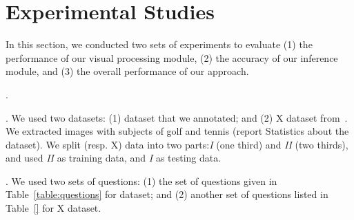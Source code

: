 \section{Experimental Studies}
\label{sec-expt}

In this section, we conducted two sets of experiments to evaluate (1) the performance of our visual processing module, (2) the accuracy of our inference module, and (3) the overall performance of our approach. 

. %

. We used two datasets: (1)  dataset that we annotated; and (2) X dataset from~\cite{}. We extracted images with subjects of golf and tennis (report Statistics about the dataset). We split  (resp. X) data into two parts:{\em  I} (one third) and {\em II} (two thirds), and used {\em II} as training data, and {\em I} as testing data. 

. We used two sets of questions: (1) the set of questions given in Table~\ref{table:questions} for  dataset; and (2) another set of questions listed in Table~\ref{} for X dataset. 

